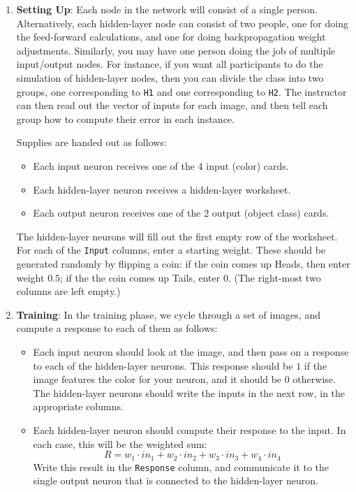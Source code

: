 \documentclass[leqno,11pt]{article}
\begin{document}
\begin{enumerate}
	\item \textbf{Setting Up}:  Each node in the network will consist of a single person.  Alternatively,
		each hidden-layer node can consist of two people, one for doing the feed-forward calculations,
		and one for doing backpropagation weight adjustments.  Similarly, you may have one person doing
		the job of multiple input/output nodes. For instance, if you want all participants to do the
		simulation of hidden-layer nodes, then you can divide the class into two groups, one
		corresponding to \texttt{H1} and one corresponding to \texttt{H2}.  The instructor can then read
		out the vector of inputs for each image, and then tell each group how to compute their error in
		each instance.

		Supplies are handed out as follows:
		\begin{itemize}
			\item Each input neuron receives one of the 4 input (color) cards.
			\item Each hidden-layer neuron receives a hidden-layer worksheet.
			\item Each output neuron receives one of the 2 output (object class) cards.
		\end{itemize}
		The hidden-layer neurons will fill out the first empty row of the worksheet.  For each of the
		\texttt{Input} columns, enter a starting weight.  These should be generated randomly by flipping
		a coin:  if the coin comes up Heads, then enter weight $0.5$;  if the the coin comes up Tails,
		enter $0$. (The right-most two columns are left empty.)

\pagebreak 

\item \textbf{Training}: In the training phase, we cycle through a set of images, and compute a
		response to each of them as follows:
		\begin{itemize}
			\item Each input neuron should look at the image, and then pass on a response to each of
				the hidden-layer neurons.  This response should be $1$ if the image features the
				color for your neuron, and it should be $0$ otherwise.  The hidden-layer neurons
				should write the inputs in the next row, in the appropriate columns.

			\item Each hidden-layer neuron should compute their response to the input.  In each
				case, this will be the weighted sum:
				\[
					R = w_1 \cdot in_1 + w_2 \cdot in_2 + w_3 \cdot in_3 + w_4 \cdot in_4 
				\]
				Write this result in the \texttt{Response} column, and communicate it to the
				single output neuron that is connected to the hidden-layer neuron.


\end{itemize}
\end{enumerate}
\end{document}
